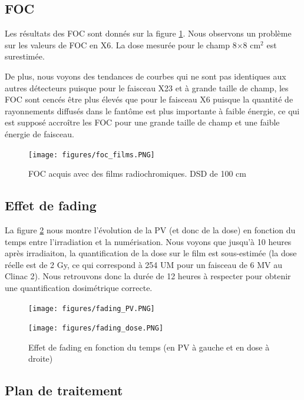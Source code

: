 \documentclass{book}
\begin{document}
\subsection{FOC}

Les résultats des FOC sont donnés sur la figure \ref*{fig_foc_films}. Nous observons un problème sur les valeurs de FOC en X6. La dose mesurée pour le champ 8$\times$8 cm$^2$ est surestimée.

De plus, nous voyons des tendances de courbes qui ne sont pas identiques aux autres détecteurs puisque pour le faisceau X23 et à grande taille de champ, les FOC sont cencés être plus élevés que pour le faisceau X6 puisque la quantité de rayonnements diffusés dans le fantôme est plus importante à faible énergie, ce qui est supposé accroître les FOC pour une grande taille de champ et une faible énergie de faisceau.

\begin{figure}[h]
  \centering
  \texttt{[image: figures/foc\_films.PNG]}
  \caption{FOC acquis avec des films radiochromiques. DSD de 100 cm}
  \label{fig_foc_films}
\end{figure}

\subsection{Effet de fading}

La figure \ref*{fig_fading} nous montre l'évolution de la PV (et donc de la dose) en fonction du temps entre l'irradiation et la numérisation. Nous voyons que jusqu'à 10 heures après irradiaiton, la quantification de la dose sur le film est sous-estimée (la dose réelle est de 2 Gy, ce qui correspond à 254 UM pour un faisceau de 6 MV au Clinac 2). Nous retrouvons donc la durée de 12 heures à respecter pour obtenir une quantification dosimétrique correcte. 

\begin{figure}[h]
  \centering
  \begin{minipage}{.47\linewidth}
    \texttt{[image: figures/fading\_PV.PNG]}
  \end{minipage}
  \begin{minipage}{.47\linewidth}
    \texttt{[image: figures/fading\_dose.PNG]}
  \end{minipage}
  \caption{Effet de fading en fonction du temps (en PV à gauche et en dose à droite)}
  \label{fig_fading}
\end{figure}

\subsection{Plan de traitement}
\end{document}

